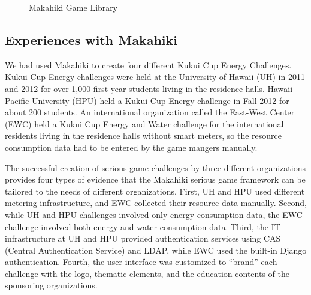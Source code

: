 \documentclass{sigchi}
\begin{document}
\begin{figure}[ht!]
	\center
		\caption{Makahiki Game Library}
		\label{fig:makahiki-games}
\end{figure}

\subsection{Experiences with Makahiki}

We had used Makahiki to create four different Kukui
Cup Energy Challenges. Kukui Cup Energy challenges were held at the
University of Hawaii (UH) in 2011 and 2012 for over 1,000 first
year students living in the residence halls. Hawaii Pacific University
(HPU) held a Kukui Cup Energy challenge in Fall 2012 for about 200
students. An international organization called the East-West Center
(EWC) held a Kukui Cup Energy and Water challenge for the
international residents living in the residence halls without smart
meters, so the resource consumption data had to be entered by the game
mangers manually.

The successful creation of serious game challenges by three different organizations
provides four types of evidence that the Makahiki serious game framework can be tailored
to the needs of different organizations. First, UH and HPU used different metering
infrastructure, and EWC collected their resource data manually.  Second, while UH and HPU
challenges involved only energy consumption data, the EWC challenge involved both energy
and water consumption data. Third, the IT infrastructure at UH and HPU provided
authentication services using CAS (Central Authentication Service) and LDAP, while EWC
used the built-in Django authentication.  Fourth, the user interface was customized to
``brand'' each challenge with the logo, thematic elements, and the education contents of
the sponsoring organizations.
\end{document}
